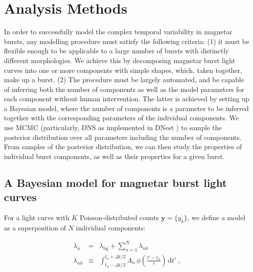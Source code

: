 \documentclass[12pt]{emulateapj}
\newcommand{\given}{\,|\,}
\newcommand{\dd}{\mathrm{d}}
\newcommand{\counts}{y}
\newcommand{\pars}{\theta}
\newcommand{\mean}{\lambda}
\newcommand{\Poisson}{{\mathcal P}}
\newcommand{\bg}{\mathrm{bg}}
\newcommand{\word}{\phi}
\begin{document}
\section{Analysis Methods}
\label{sec:methods}
In order to successfully model the complex temporal variability in magnetar bursts, any modelling procedure must satisfy the following criteria: (1) it must be flexible enough to be applicable to a large number of bursts with distinctly different morphologies. We achieve this by decomposing magnetar burst light curves into one or more components with simple shapes, which, taken together, make up a burst. (2) The procedure must be largely automated, and be capable of inferring both the number of components as well as the model parameters for each component without human intervention. The latter is achieved by setting up a Bayesian model, where the number of components is a parameter to be inferred together with the corresponding parameters of the individual components. We use MCMC (particularly, DNS as implemented in DNest \citep{brewer2011}) to sample the posterior distribution over all parameters including the number of components. From samples of the posterior distribution,
we can then study the properties of individual burst components, as well as their properties for a given burst.

\subsection{A Bayesian model for magnetar burst light curves}
\label{sec:model}

For a light curve with $K$ Poisson-distributed counts $\bm{\counts} = \{\counts_k\}$, we define a model as a superposition of $N$ individual components:

\begin{eqnarray}
\mean_n &=& \mean_{\bg} + \sum_{n=1}^N \mean_{nk}
\\
\mean_{nk} &\equiv& \int_{t_n-\Delta t/2}^{t_n+\Delta t/2} A_n\,\word\left(\frac{t'-t_n}{\tau}\right)\,\dd t' \; ,
\end{eqnarray}
\end{document}
